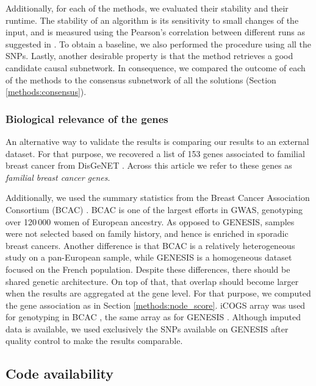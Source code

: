 \documentclass[twocolumn, 10pt]{article}
\begin{document}
Additionally, for each of the methods, we evaluated their stability and their runtime. The stability of an algorithm is its sensitivity to small changes of the input, and is measured using the Pearson's correlation between different runs as suggested in \cite{nogueira_measuring_2016}. To obtain a baseline, we also performed the procedure using all the SNPs. Lastly, another desirable property is that the method retrieves a good candidate causal subnetwork. In consequence, we compared the outcome of each of the methods to the consensus subnetwork of all the solutions (Section \ref{methods:consensus}).

\subsubsection{Biological relevance of the genes}
\label{methods:bcac}
An alternative way to validate the results is comparing our results to an external dataset. For that purpose, we recovered a list of 153 genes associated to familial breast cancer from DisGeNET \cite{pinero_disgenet:_2017}. Across this article we refer to these genes as \emph{familial breast cancer genes}.

Additionally, we used the summary statistics from the Breast Cancer Association Consortium (BCAC) \cite{michailidou_genome-wide_2015}. BCAC is one of the largest efforts in GWAS, genotyping over 120\,000 women of European ancestry. As opposed to GENESIS, samples were not selected based on family history, and hence is enriched in sporadic breast cancers. Another difference is that BCAC is a relatively heterogeneous study on a pan-European sample, while GENESIS is a homogeneous dataset focused on the French population. Despite these differences, there should be shared genetic architecture. On top of that, that overlap should become larger when the results are aggregated at the gene level. For that purpose, we computed the gene association as in Section \ref{methods:node_score}. iCOGS array was used for genotyping in BCAC \cite{sakoda_turning_2013}, the same array as for GENESIS \cite{sinilnikova_genesis:_2016}. Although imputed data is available, we used exclusively the SNPs available on GENESIS after quality control to make the results comparable.

\subsection{Code availability}
\label{sec:org1d907c0}
\end{document}
